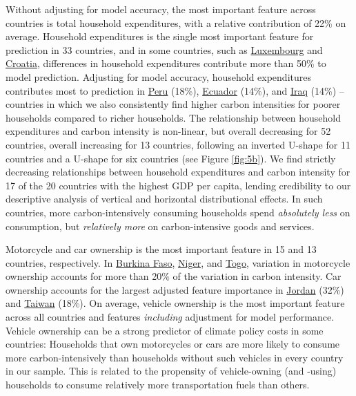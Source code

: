 \documentclass[12pt, a4paper]{article}
\begin{document}
Without adjusting for model accuracy, the most important feature across countries is total household expenditures, with a relative contribution of 22\% on average. Household expenditures is the single most important feature for prediction in 33 countries, and in some countries, such as \hyperref[fig:5b_LUX]{Luxembourg} and \hyperref[fig:5b_HRV]{Croatia}, differences in household expenditures contribute more than 50\% to model prediction. Adjusting for model accuracy, household expenditures contributes most to prediction in \hyperref[fig:5b_PER]{Peru} (18\%), \hyperref[fig:5b_ECU]{Ecuador} (14\%), and \hyperref[fig:5b_IRQ]{Iraq} (14\%) -- countries in which we also consistently find higher carbon intensities for poorer households compared to richer households. The relationship between household expenditures and carbon intensity is non-linear, but overall decreasing for 52 countries, overall increasing for 13 countries, following an inverted U-shape for 11 countries and a U-shape for six countries (see Figure \ref{fig:5b}). We find strictly decreasing relationships between household expenditures and carbon intensity for 17 of the 20 countries with the highest GDP per capita, lending credibility to our descriptive analysis of vertical and horizontal distributional effects. In such countries, more carbon-intensively consuming households spend \textit{absolutely less} on consumption, but \textit{relatively more} on carbon-intensive goods and services.

Motorcycle and car ownership is the most important feature in 15 and 13 countries, respectively. In \hyperref[fig:5b_BFA]{Burkina Faso}, \hyperref[fig:5b_NER]{Niger}, and \hyperref[fig:5b_TGO]{Togo}, variation in motorcycle ownership accounts for more than 20\% of the variation in carbon intensity. Car ownership accounts for the largest adjusted feature importance in \hyperref[fig:5b_JOR]{Jordan} (32\%) and \hyperref[fig:5b_TWN]{Taiwan} (18\%). On average, vehicle ownership is the most important feature across all countries and features \textit{including} adjustment for model performance. Vehicle ownership can be a strong predictor of climate policy costs in some countries: Households that own motorcycles or cars are more likely to consume more carbon-intensively than households without such vehicles in every country in our sample. This is related to the propensity of vehicle-owning (and -using) households to consume relatively more transportation fuels than others.
\end{document}
